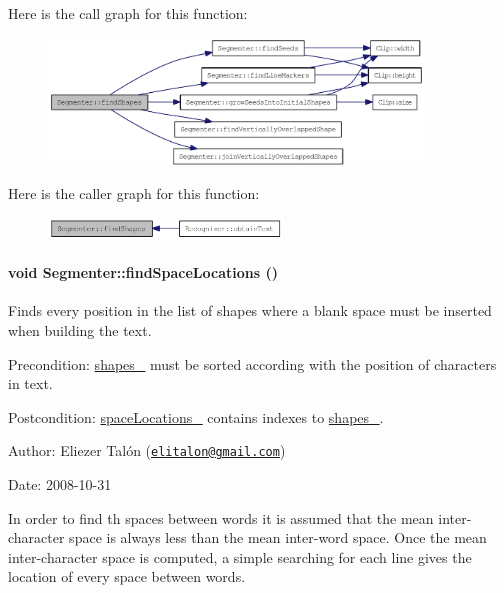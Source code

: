 Here is the call graph for this function:\nopagebreak
\begin{figure}[H]
\begin{center}
\leavevmode
\includegraphics[width=282pt]{class_segmenter_465c8e755bb56d247add080a04377520_cgraph}
\end{center}
\end{figure}


Here is the caller graph for this function:\nopagebreak
\begin{figure}[H]
\begin{center}
\leavevmode
\includegraphics[width=176pt]{class_segmenter_465c8e755bb56d247add080a04377520_icgraph}
\end{center}
\end{figure}
\hypertarget{class_segmenter_7f4ab775f61d92c4d051f6ef4685cf6f}{
\paragraph[{findSpaceLocations}]{\setlength{\rightskip}{0pt plus 5cm}void Segmenter::findSpaceLocations ()}\hfill}
\label{class_segmenter_7f4ab775f61d92c4d051f6ef4685cf6f}


Finds every position in the list of shapes where a blank space must be inserted when building the text. 

\begin{Desc}
\item[Precondition:]\hyperlink{class_segmenter_41b94ede2829063e0937dc150756e77e}{shapes\_\-} must be sorted according with the position of characters in text.\end{Desc}
\begin{Desc}
\item[Postcondition:]\hyperlink{class_segmenter_b6a330577017efe9e49c174c04c4f7c3}{spaceLocations\_\-} contains indexes to \hyperlink{class_segmenter_41b94ede2829063e0937dc150756e77e}{shapes\_\-}.\end{Desc}
\begin{Desc}
\item[Author:]Eliezer Talón (\href{mailto:elitalon@gmail.com}{\tt elitalon@gmail.com}) \end{Desc}
\begin{Desc}
\item[Date:]2008-10-31\end{Desc}
In order to find th spaces between words it is assumed that the mean inter-character space is always less than the mean inter-word space. Once the mean inter-character space is computed, a simple searching for each line gives the location of every space between words. 


